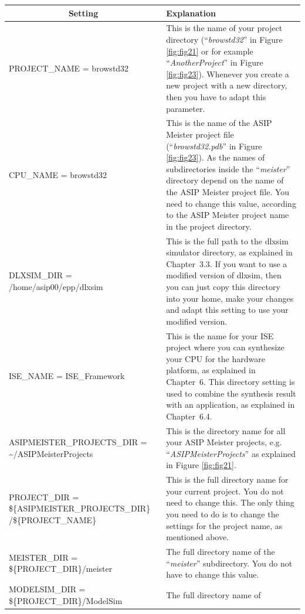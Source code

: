 \begin{table}[!htb]
	\centering
	\begin{tabular}{|p{6cm}|p{11cm}|}
		\hline
		\multicolumn{1}{|c|}{\textbf{Setting}} & \textbf{Explanation}                                                               \\ \hline
		PROJECT\_NAME = browstd32 & This is the name of your project directory
		(``\emph{browstd32}'' in Figure \ref{fig:fig21} or for
		example ``\emph{AnotherProject}'' in Figure \ref{fig:fig23}). Whenever you create a new project with a new directory, then you
		have to adapt this parameter.
		\\ \hline
		CPU\_NAME = browstd32 & This is the name of the ASIP Meister project
		file (``\emph{browstd32.pdb}'' in Figure \ref{fig:fig23}). As the names of subdirectories inside the ``\emph{meister}''
		directory depend on the name of the ASIP Meister project file. You need
		to change this value, according to the ASIP Meister project name in the
		project directory.
		\\ \hline
		DLXSIM\_DIR = /home/asip00/epp/dlxsim & This is the full path to the
		dlxsim simulator directory, as explained in Chapter~3.3. If you want to
		use a modified version of dlxsim, then you can just copy this directory
		into your home, make your changes and adapt this setting to use your
		modified version.
		\\ \hline
		ISE\_NAME = ISE\_Framework & This is the name for your ISE project where
		you can synthesize your CPU for the hardware platform, as explained in
		Chapter~6. This directory setting is used to combine the synthesis
		result with an application, as explained in Chapter~6.4.
		\\ \hline
		ASIPMEISTER\_PROJECTS\_DIR =
				\textasciitilde/ASIPMeisterProjects & This is the directory name for
		all your ASIP Meister projects, e.g. ``\emph{ASIPMeisterProjects}'' as
		explained in Figure \ref{fig:fig21}.
		\\ \hline
		PROJECT\_DIR = \$\{ASIPMEISTER\_PROJECTS\_DIR\} /\$\{PROJECT\_NAME\} &
		This is the full directory name for your current project. You do not
		need to change this. The only thing you need to do is to change the
		settings for the project name, as mentioned above.
		\\ \hline
		MEISTER\_DIR = \$\{PROJECT\_DIR\}/meister & The full directory name of
		the ``\emph{meister}'' subdirectory. You do not have to change this
		value.
		\\ \hline
		MODELSIM\_DIR = \$\{PROJECT\_DIR\}/ModelSim & The full directory name of

\end{tabular}
\end{table}
